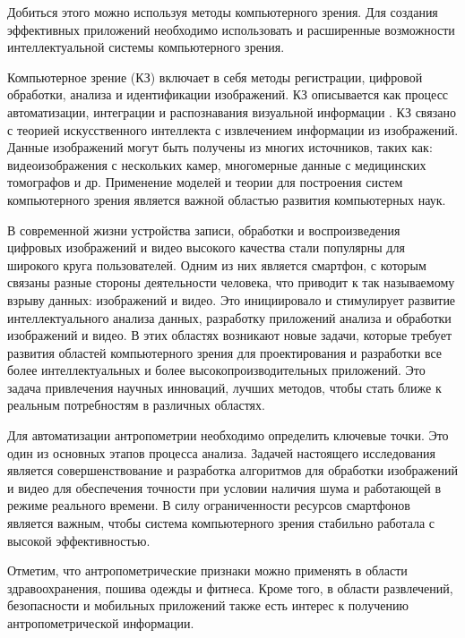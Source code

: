 Добиться этого можно используя методы компьютерного зрения. Для создания эффективных приложений необходимо использовать и расширенные возможности интеллектуальной системы компьютерного зрения.

Компьютерное зрение (КЗ) включает в себя методы регистрации, цифровой обработки, анализа и идентификации изображений. КЗ описывается как процесс автоматизации, интеграции и распознавания визуальной информации \cite{Wang2016,Maria2016,Ioan2011,Lauren2013,Saha2005,Azriel2001}. КЗ связано с теорией искусственного интеллекта с извлечением информации из изображений. Данные изображений могут быть получены из многих источников, таких как: видеоизображения с нескольких камер, многомерные данные с медицинских томографов и др. Применение моделей и теории для построения систем компьютерного зрения является важной областью развития компьютерных наук.

В современной жизни устройства записи, обработки и воспроизведения цифровых изображений и видео высокого качества стали популярны для широкого круга пользователей. Одним из них является смартфон, с которым связаны разные стороны деятельности человека, что приводит к так называемому взрыву данных: изображений и видео. Это инициировало и стимулирует развитие интеллектуального анализа данных, разработку приложений анализа и обработки изображений и видео. В этих областях возникают новые задачи, которые требует развития областей компьютерного зрения для проектирования и разработки все более интеллектуальных и более высокопроизводительных приложений. Это задача привлечения научных инноваций, лучших методов, чтобы стать ближе к реальным потребностям в различных областях.

Для автоматизации антропометрии необходимо определить ключевые точки. Это один из основных этапов процесса анализа. Задачей настоящего исследования является совершенствование и разработка алгоритмов для обработки изображений и видео для обеспечения точности при условии наличия шума и работающей в режиме реального времени. В силу ограниченности ресурсов смартфонов является важным, чтобы система компьютерного зрения стабильно работала с высокой эффективностью.

Отметим, что антропометрические признаки можно применять в области здравоохранения, пошива одежды и фитнеса. Кроме того, в области развлечений, безопасности и мобильных приложений также есть интерес к получению антропометрической информации.

